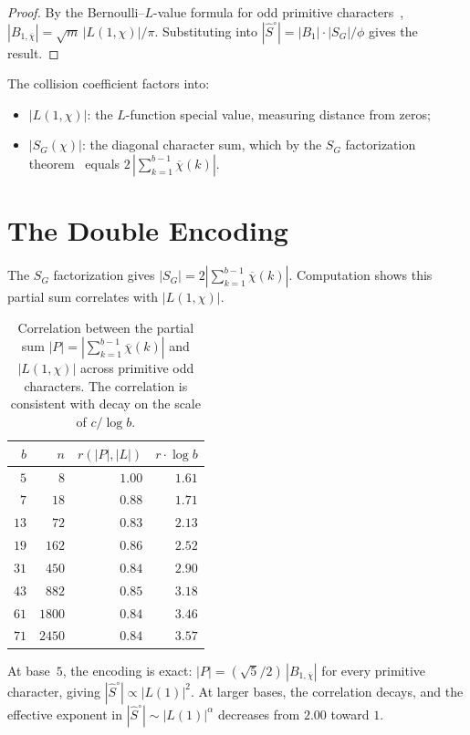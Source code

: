 \documentclass[12pt]{amsart}
\theoremstyle{definition}
\theoremstyle{remark}
\begin{document}
\begin{proof}
By the Bernoulli--$L$-value formula for odd primitive
characters~\cite{davenport},
$|B_{1,\overline{\chi}}| = \sqrt{m}\,
|L(1, \chi)| / \pi$.
Substituting into
$|\hat{S}^{\circ}| = |B_1| \cdot |S_G| / \phi$
gives the result.
\end{proof}

The collision coefficient factors into:
\begin{itemize}
\item $|L(1, \chi)|$: the $L$-function special value,
measuring distance from zeros;
\item $|S_G(\chi)|$: the diagonal character sum,
which by the $S_G$ factorization
theorem~\cite{paperC} equals
$2\,|\sum_{k=1}^{b-1} \overline{\chi}(k)|$.
\end{itemize}

\section{The Double Encoding}

The $S_G$ factorization gives
$|S_G| = 2|\sum_{k=1}^{b-1} \overline{\chi}(k)|$.
Computation shows this partial sum correlates with
$|L(1, \chi)|$.

\begin{table}[h]
\centering
\begin{tabular}{rrrr}
\toprule
$b$ & $n$ & $r(|P|, |L|)$ &
$r \cdot \log b$ \\
\midrule
$5$ & $8$ & $1.00$ & $1.61$ \\
$7$ & $18$ & $0.88$ & $1.71$ \\
$13$ & $72$ & $0.83$ & $2.13$ \\
$19$ & $162$ & $0.86$ & $2.52$ \\
$31$ & $450$ & $0.84$ & $2.90$ \\
$43$ & $882$ & $0.85$ & $3.18$ \\
$61$ & $1800$ & $0.84$ & $3.46$ \\
$71$ & $2450$ & $0.84$ & $3.57$ \\
\bottomrule
\end{tabular}
\caption{Correlation between the partial sum
$|P| = |\sum_{k=1}^{b-1} \overline{\chi}(k)|$ and
$|L(1, \chi)|$ across primitive odd characters.
The correlation is consistent with decay on the
scale of $c / \log b$.}
\label{tab:decay}
\end{table}

At base~$5$, the encoding is exact:
$|P| = (\sqrt{5}/2)\,|B_{1,\overline{\chi}}|$ for
every primitive character, giving
$|\hat{S}^{\circ}| \propto |L(1)|^2$. At larger
bases, the correlation decays, and the effective
exponent in $|\hat{S}^{\circ}| \sim |L(1)|^{\alpha}$
decreases from $2.00$ toward $1$.
\end{document}
